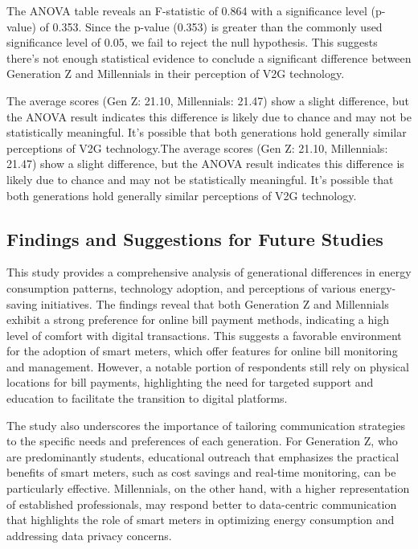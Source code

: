 \documentclass[
  letterpaper,
  DIV=11,
  numbers=noendperiod]{scrartcl}
\begin{document}
The ANOVA table reveals an F-statistic of 0.864 with a significance
level (p-value) of 0.353. Since the p-value (0.353) is greater than the
commonly used significance level of 0.05, we fail to reject the null
hypothesis. This suggests there's not enough statistical evidence to
conclude a significant difference between Generation Z and Millennials
in their perception of V2G technology.

The average scores (Gen Z: 21.10, Millennials: 21.47) show a slight
difference, but the ANOVA result indicates this difference is likely due
to chance and may not be statistically meaningful. It's possible that
both generations hold generally similar perceptions of V2G
technology.The average scores (Gen Z: 21.10, Millennials: 21.47) show a
slight difference, but the ANOVA result indicates this difference is
likely due to chance and may not be statistically meaningful. It's
possible that both generations hold generally similar perceptions of V2G
technology.

\subsection{Findings and Suggestions for Future
Studies}\label{findings-and-suggestions-for-future-studies}

This study provides a comprehensive analysis of generational differences
in energy consumption patterns, technology adoption, and perceptions of
various energy-saving initiatives. The findings reveal that both
Generation Z and Millennials exhibit a strong preference for online bill
payment methods, indicating a high level of comfort with digital
transactions. This suggests a favorable environment for the adoption of
smart meters, which offer features for online bill monitoring and
management. However, a notable portion of respondents still rely on
physical locations for bill payments, highlighting the need for targeted
support and education to facilitate the transition to digital platforms.

The study also underscores the importance of tailoring communication
strategies to the specific needs and preferences of each generation. For
Generation Z, who are predominantly students, educational outreach that
emphasizes the practical benefits of smart meters, such as cost savings
and real-time monitoring, can be particularly effective. Millennials, on
the other hand, with a higher representation of established
professionals, may respond better to data-centric communication that
highlights the role of smart meters in optimizing energy consumption and
addressing data privacy concerns.
\end{document}
